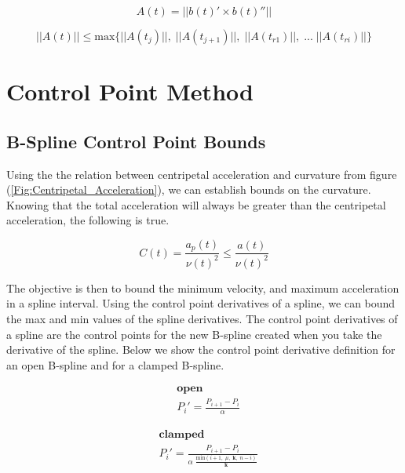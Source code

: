 \documentclass{article}
\begin{document}
\begin{equation}
    A(t) = ||b(t)' \times b(t)''||
\end{equation}

\begin{equation}
    ||A(t)|| \leq \text{max}\{ ||A(t_j)|| ,\; ||A(t_{j+1})|| ,\; ||A(t_{r1})|| ,\; ... \;  ||A(t_{ri})|| \}
\end{equation}

\section{Control Point Method}

\subsection{B-Spline Control Point Bounds}

Using the the relation between centripetal acceleration and curvature from figure (\ref{Fig:Centripetal_Acceleration}), we can establish bounds on the curvature. Knowing that the total acceleration will always be greater than the centripetal acceleration, the following is true.

\begin{equation}
    C(t) = \frac{a_p(t)}{\nu(t)^2} \leq \frac{a(t)}{\nu(t)^2}  
\end{equation}

The objective is then to bound the minimum velocity, and maximum acceleration in a spline interval. Using the control point derivatives of a spline, we can bound the max and min values of the spline derivatives. The control point derivatives of a spline are the control points for the new B-spline created when you take the derivative of the spline. Below we show the control point derivative definition for an open B-spline and for a clamped B-spline.

\begin{equation}
\begin{aligned}
    & \textbf{open} \\
    & P_i' = \frac{P_{i+1} - P_{i}}{\alpha}
\end{aligned}
\end{equation}

\begin{equation}
\begin{aligned}
    & \textbf{clamped} \\
    & P_i' = \frac{ P_{i+1} - P_i}{\alpha \; \frac{\text{min}(i+1,\;\mu,\;\textbf{k},\; n-i)}{\textbf{k}}}
\end{aligned}
\end{equation}
\end{document}
